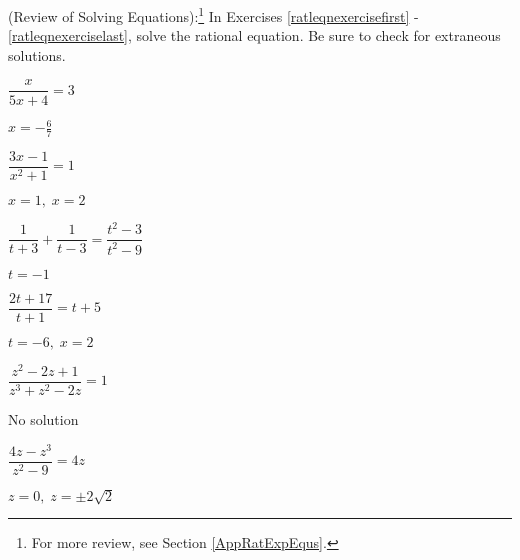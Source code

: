 \documentclass{ximera}
\begin{document}
	\author{Stitz-Zeager}



(Review of Solving Equations):\footnote{For more review, see Section \ref{AppRatExpEqus}.} In Exercises \ref{ratleqnexercisefirst} - \ref{ratleqnexerciselast},  solve the rational equation.  Be sure to check for extraneous solutions.




\begin{question}
$\dfrac{x}{5x + 4} = 3$
\begin{solution}
$x = -\frac{6}{7}$
\end{solution}

\end{question}

\begin{question}
$\dfrac{3x - 1}{x^{2} + 1} = 1$

\begin{solution}
$x = 1, \; x = 2$
\end{solution}

\end{question}

\begin{question}
$\dfrac{1}{t + 3} + \dfrac{1}{t - 3} = \dfrac{t^{2} - 3}{t^{2} - 9}$
\begin{solution}
$t = -1$

\end{solution}

\end{question}

\begin{question}
$\dfrac{2t + 17}{t + 1} = t + 5$

\begin{solution}
$t = -6, \; x = 2$
\end{solution}

\end{question}

\begin{question}
$\dfrac{z^{2} - 2z + 1}{z^{3} + z^{2} - 2z} = 1$
\begin{solution}
No solution
\end{solution}

\end{question}

\begin{question}
$\dfrac{4z- z^3}{z^{2} - 9} = 4z$  

\begin{solution}
$z = 0, \; z = \pm 2\sqrt{2}$

\end{solution}

\end{question}
\end{document}
